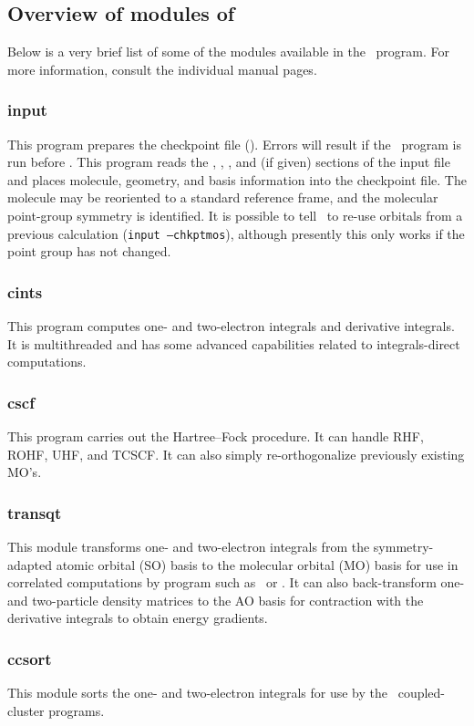 \subsection{Overview of modules of \PSIthree}
Below is a very brief list of some of the modules available in the
\PSIthree\ program.  For more information, consult the individual
manual pages.
\subsubsection{input}
This program prepares the checkpoint file (\chkptfile).  Errors will
result if the \PSIpsi\ program is run before \PSIinput.  This program
reads the , , , and (if given)
 sections of the input file and places molecule,
geometry, and basis information into the checkpoint file.  The
molecule may be reoriented to a standard reference frame, and the
molecular point-group symmetry is identified.  It is possible to tell
\PSIinput\ to re-use orbitals from a previous calculation ({\tt input
--chkptmos}), although presently this only works if the point group has
not changed.

\subsubsection{cints}
This program computes one- and two-electron integrals and derivative
integrals.  It is multithreaded and has some advanced capabilities
related to integrals-direct computations.

\subsubsection{cscf}
This program carries out the Hartree--Fock procedure.  It can handle
RHF, ROHF, UHF, and TCSCF.  It can also simply re-orthogonalize
previously existing MO's.

\subsubsection{transqt}
This module transforms one- and two-electron integrals from the
symmetry-adapted atomic orbital (SO) basis to the molecular orbital
(MO) basis for use in correlated computations by program such as
\PSIdetci\ or \PSIccenergy.  It can also back-transform one- and
two-particle density matrices to the AO basis for contraction with the
derivative integrals to obtain energy gradients.

\subsubsection{ccsort}
This module sorts the one- and two-electron integrals for use by the
\PSIthree\ coupled-cluster programs.

